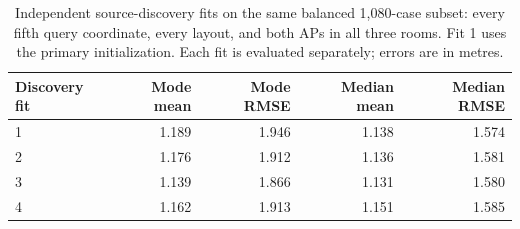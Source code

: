 \begin{table}[H]
\centering
\caption{Independent source-discovery fits on the same balanced 1,080-case subset: every fifth query coordinate, every layout, and both APs in all three rooms. Fit 1 uses the primary initialization. Each fit is evaluated separately; errors are in metres.}
\label{tab:seeds}
\setlength{\tabcolsep}{4pt}
\begin{tabular}{lrrrr}
\toprule
Discovery fit & Mode mean & Mode RMSE & Median mean & Median RMSE\\
\midrule
1 & 1.189 & 1.946 & 1.138 & 1.574\\
2 & 1.176 & 1.912 & 1.136 & 1.581\\
3 & 1.139 & 1.866 & 1.131 & 1.580\\
4 & 1.162 & 1.913 & 1.151 & 1.585\\
\bottomrule
\end{tabular}
\end{table}
